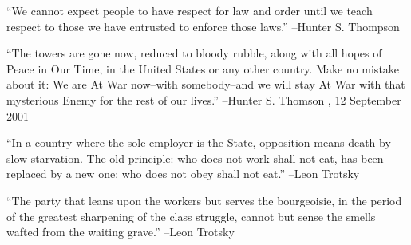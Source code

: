 \documentclass{article}%
\begin{document}
\linebreak%
\vspace{1mm}%
\begin{minipage}{\textwidth}%
\flushleft%
“We cannot expect people to have respect for law and order until we teach respect to those we have entrusted to enforce those laws.”%
\linebreak%
\vspace{1mm}%
–Hunter S. Thompson%
\linebreak%
\vspace{1mm}%
\end{minipage}%
\linebreak%
\vspace{1mm}%
\begin{minipage}{\textwidth}%
\flushleft%
“The towers are gone now, reduced to bloody rubble, along with all hopes of Peace in  Our Time, in the United States or any other country. Make no mistake about it: We are At War now–with somebody–and we will stay At War with that mysterious Enemy for the rest of our lives.”%
\linebreak%
\vspace{1mm}%
–Hunter S. Thomson%
, 12 September 2001%
\linebreak%
\vspace{1mm}%
\end{minipage}%
\linebreak%
\vspace{1mm}%
\begin{minipage}{\textwidth}%
\flushleft%
“In a country where the sole employer is the State, opposition means death by slow starvation. The old principle: who does not work shall not eat, has been replaced by a new one: who does not obey shall not eat.”%
\linebreak%
\vspace{1mm}%
–Leon Trotsky%
\linebreak%
\vspace{1mm}%
\end{minipage}%
\linebreak%
\vspace{1mm}%
\begin{minipage}{\textwidth}%
\flushleft%
“The party that leans upon the workers but serves the bourgeoisie, in the period of the greatest sharpening of the class struggle, cannot but sense the smells wafted from the waiting grave.”%
\linebreak%
\vspace{1mm}%
–Leon Trotsky%
\linebreak%
\vspace{1mm}%
\end{minipage}%
\end{document}
